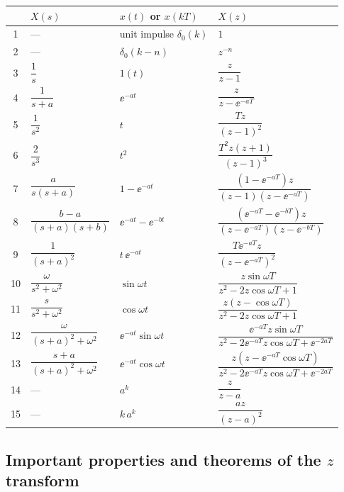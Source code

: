 \begin{center}\renewcommand{\arraystretch}{2.3}
\begin{tabular}{@{}clll@{}}\toprule
 & $X(s)$ & $x(t)$ or $x(kT)$ & $X(z)$ \\ \midrule
1 & --- & unit impulse $\delta_0(k)$ & $1$ \\
2 & --- & $\delta_0(k-n)$ & $z^{-n}$ \\
3 & $\dfrac1s$ & $1(t)$ & $\dfrac{z}{z-1}$ \\
4 & $\dfrac{1}{s+a}$ & $\ee^{-at}$ & $\dfrac{z}{z-\ee^{-aT}}$ \\
5 & $\dfrac{1}{s^{2}}$ & $t$ & $\dfrac{Tz}{(z-1)^{2}}$ \\
6 & $\dfrac{2}{s^{3}}$ & $t^{2}$ & $\dfrac{T^{2}z(z+1)}{(z-1)^{3}}$ \\
7 & $\dfrac{a}{s(s+a)}$ & $1-\ee^{-at}$ & $\dfrac{(1-\ee^{-aT})z}{(z-1)(z-\ee^{-aT})}$ \\
8 & $\dfrac{b-a}{(s+a)(s+b)}$ & $\ee^{-at}-\ee^{-bt}$ & $\dfrac{(\ee^{-aT}-\ee^{-bT})z}{(z-\ee^{-aT})(z-\ee^{-bT})}$ \\
9 & $\dfrac{1}{(s+a)^{2}}$ & $t\,\ee^{-at}$ & $\dfrac{T\ee^{-aT}z}{(z-\ee^{-aT})^{2}}$ \\
10 & $\dfrac{\omega}{s^{2}+\omega^{2}}$ & $\sin\omega t$ & $\dfrac{z\sin\omega T}{z^{2}-2z\cos\omega T+1}$ \\
11 & $\dfrac{s}{s^{2}+\omega^{2}}$ & $\cos\omega t$ & $\dfrac{z(z-\cos\omega T)}{z^{2}-2z\cos\omega T+1}$ \\
12 & $\dfrac{\omega}{(s+a)^{2}+\omega^{2}}$ & $\ee^{-at}\sin\omega t$ & $\dfrac{\ee^{-aT}z\sin\omega T}{z^{2}-2\ee^{-aT}z\cos\omega T+\ee^{-2aT}}$ \\
13 & $\dfrac{s+a}{(s+a)^{2}+\omega^{2}}$ & $\ee^{-at}\cos\omega t$ & $\dfrac{z(z-\ee^{-aT}\cos\omega T)}{z^{2}-2\ee^{-aT}z\cos\omega T+\ee^{-2aT}}$ \\
14 & --- & $a^{k}$ & $\dfrac{z}{z-a}$ \\
15 & --- & $k\,a^{k}$ & $\dfrac{az}{(z-a)^{2}}$ \\ \bottomrule
\end{tabular}
\end{center}

\subsection{Important properties and theorems of the $z$ transform}

